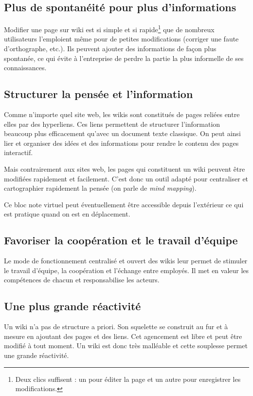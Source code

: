 \documentclass[pdftex,a4paper,11pt]{article}
\begin{document}
\subsection{Plus de spontanéité pour plus d'informations}
Modifier une page sur wiki est si simple et si rapide\footnote{Deux clics suffisent : un pour éditer la page et un autre pour enregistrer les modifications.} que de nombreux utilisateurs l'emploient même pour de petites modifications (corriger une faute d'orthographe, etc.). Ils peuvent ajouter des informations de façon plus spontanée, ce qui évite à l'entreprise de perdre la partie la plus informelle de ses connaissances.

\subsection{Structurer la pensée et l'information}
Comme n'importe quel site web, les wikis sont constitués de pages reliées entre elles par des hyperliens. Ces liens permettent de structurer l'information beaucoup plus efficacement qu'avec un document texte classique. On peut ainsi lier et organiser des idées et des informations pour rendre le contenu des pages interactif.

Mais contrairement aux sites web, les pages qui constituent un wiki peuvent être modifiées rapidement et facilement. C'est donc un outil adapté pour centraliser et cartographier rapidement la pensée (on parle de \emph{mind mapping}).

Ce bloc note virtuel peut éventuellement être accessible depuis l'extérieur ce qui est pratique quand on est en déplacement.

\subsection{Favoriser la coopération et le travail d'équipe}
Le mode de fonctionnement centralisé et ouvert des wikis leur permet de stimuler le travail d'équipe, la coopération et l'échange entre employés. Il met en valeur les compétences de chacun et responsabilise les acteurs.

\subsection{Une plus grande réactivité}
Un wiki n'a pas de structure a priori. Son squelette se construit au fur et à mesure en ajoutant des pages et des liens. Cet agencement est libre et peut être modifié à tout moment. Un wiki est donc très malléable et cette souplesse permet une grande réactivité.
\end{document}
